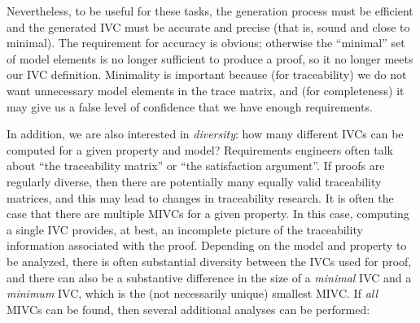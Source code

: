 \noindent Nevertheless, to be useful for these tasks, the generation
process must be efficient and the generated IVC must be
accurate and precise (that is, sound and close to minimal).  The requirement for accuracy is obvious; otherwise the ``minimal'' set of model elements is no longer sufficient to produce a proof, so it no longer meets our IVC definition.  Minimality is important because (for traceability) we do not want unnecessary model elements in the trace matrix, and (for completeness) it may give us a false level of confidence that we have enough requirements.

In addition, %
we are also interested in {\em diversity}:  how many different IVCs can be computed for a given property and model? Requirements engineers often talk about ``the traceability matrix'' or ``the satisfaction argument''.  If proofs are regularly diverse, then there are potentially many equally valid traceability matrices, and this may lead to changes in traceability research. 
It is often the case that there are multiple MIVCs for a given property.  In this case, computing a single IVC provides, at best, an incomplete picture of the traceability information associated with the proof.  Depending on the model and property to be analyzed, there is often substantial diversity between the IVCs used for proof, and there can also be a substantive difference in the size of a {\em minimal} IVC and a {\em minimum} IVC, which is the (not necessarily unique) smallest MIVC.
 If {\em all} MIVCs can be found, then several additional analyses can be performed:
